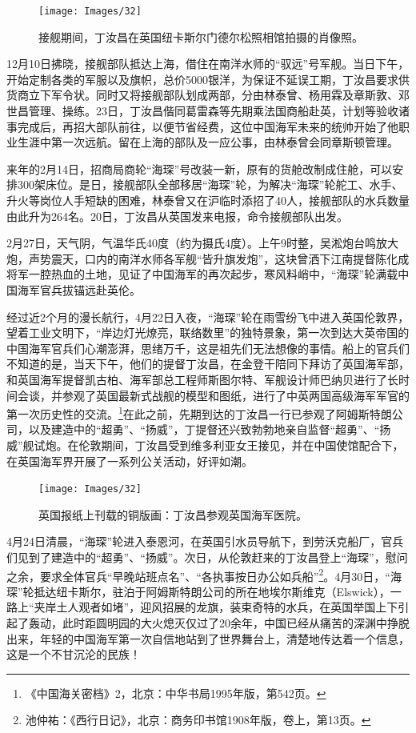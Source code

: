 \documentclass[12pt,UTF8]{ctexbook}
\begin{document}
\begin{figure}[htbp]
	\centering
	\texttt{[image: Images/32]}
	\caption{接舰期间，丁汝昌在英国纽卡斯尔门德尔松照相馆拍摄的肖像照。}
	\label{fig:1}
\end{figure}

12月10日拂晓，接舰部队抵达上海，借住在南洋水师的“驭远”号军舰。当日下午，开始定制各类的军服以及旗帜，总价5000银洋，为保证不延误工期，丁汝昌要求供货商立下军令状。同时又将接舰部队划成两部，分由林泰曾、杨用霖及章斯敦、邓世昌管理、操练。23日，丁汝昌偕同葛雷森等先期乘法国商船赴英，计划等验收诸事完成后，再招大部队前往，以便节省经费，这位中国海军未来的统帅开始了他职业生涯中第一次远航。留在上海的部队及一应公事，由林泰曾会同章斯顿管理。

来年的2月14日，招商局商轮“海琛”号改装一新，原有的货舱改制成住舱，可以安排300架床位。是日，接舰部队全部移居“海琛”轮，为解决“海琛”轮舵工、水手、升火等岗位人手短缺的困难，林泰曾又在沪临时添招了40人，接舰部队的水兵数量由此升为264名。20日，丁汝昌从英国发来电报，命令接舰部队出发。

2月27日，天气阴，气温华氏40度（约为摄氏4度）。上午9时整，吴淞炮台鸣放大炮，声势震天，口内的南洋水师各军舰“皆升旗发炮”，这块曾洒下江南提督陈化成将军一腔热血的土地，见证了中国海军的再次起步，寒风料峭中，“海琛”轮满载中国海军官兵拔锚远赴英伦。

经过近2个月的漫长航行，4月22日入夜，“海琛”轮在雨雪纷飞中进入英国伦敦界，望着工业文明下，“岸边灯光燎亮，联络数里”的独特景象，第一次到达大英帝国的中国海军官兵们心潮澎湃，思绪万千，这是祖先们无法想像的事情。船上的官兵们不知道的是，当天下午，他们的提督丁汝昌，在金登干陪同下拜访了英国海军部，和英国海军提督凯古柏、海军部总工程师斯图尔特、军舰设计师巴纳贝进行了长时间会谈，并参观了英国最新式战舰的模型和图纸，进行了中英两国高级海军军官的第一次历史性的交流。\footnote{《中国海关密档》2，北京：中华书局1995年版，第542页。}在此之前，先期到达的丁汝昌一行已参观了阿姆斯特朗公司，以及建造中的“超勇”、“扬威”，丁提督还兴致勃勃地亲自监督“超勇”、“扬威”舰试炮。在伦敦期间，丁汝昌受到维多利亚女王接见，并在中国使馆配合下，在英国海军界开展了一系列公关活动，好评如潮。

\begin{figure}[htbp]
	\centering
	\texttt{[image: Images/32]}
	\caption{英国报纸上刊载的铜版画：丁汝昌参观英国海军医院。}
	\label{fig:1}
\end{figure}

4月24日清晨，“海琛”轮进入泰恩河，在英国引水员导航下，到劳沃克船厂，官兵们见到了建造中的“超勇”、“扬威”。次日，从伦敦赶来的丁汝昌登上“海琛”，慰问之余，要求全体官兵“早晚站班点名”、“各执事按日办公如兵船”\footnote{池仲祐：《西行日记》，北京：商务印书馆1908年版，卷上，第13页。}。4月30日，“海琛”轮抵达纽卡斯尔，驻泊于阿姆斯特朗公司的所在地埃尔斯维克（Elswick），一路上“夹岸土人观者如堵”，迎风招展的龙旗，装束奇特的水兵，在英国举国上下引起了轰动，此时距圆明园的大火熄灭仅过了20余年，中国已经从痛苦的深渊中挣脱出来，年轻的中国海军第一次自信地站到了世界舞台上，清楚地传达着一个信息，这是一个不甘沉沦的民族！
\end{document}
